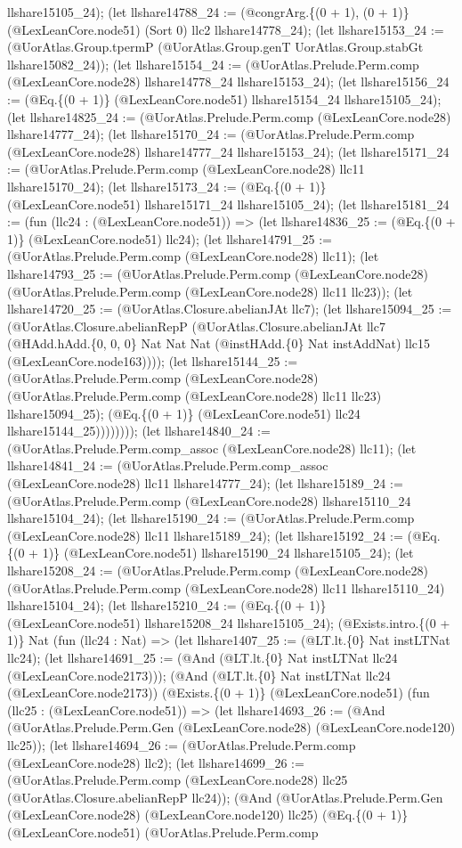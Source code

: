 \documentclass[11pt]{article}
\begin{document}
llshare15105\_24); (let llshare14788\_24 := (@congrArg.\{(0 + 1), (0 + 1)\} (@LexLeanCore.node51) (Sort 0) llc2 llshare14778\_24); (let llshare15153\_24 := (@UorAtlas.Group.tpermP (@UorAtlas.Group.genT UorAtlas.Group.stabGt llshare15082\_24)); (let llshare15154\_24 := (@UorAtlas.Prelude.Perm.comp (@LexLeanCore.node28) llshare14778\_24 llshare15153\_24); (let llshare15156\_24 := (@Eq.\{(0 + 1)\} (@LexLeanCore.node51) llshare15154\_24 llshare15105\_24); (let llshare14825\_24 := (@UorAtlas.Prelude.Perm.comp (@LexLeanCore.node28) llshare14777\_24); (let llshare15170\_24 := (@UorAtlas.Prelude.Perm.comp (@LexLeanCore.node28) llshare14777\_24 llshare15153\_24); (let llshare15171\_24 := (@UorAtlas.Prelude.Perm.comp (@LexLeanCore.node28) llc11 llshare15170\_24); (let llshare15173\_24 := (@Eq.\{(0 + 1)\} (@LexLeanCore.node51) llshare15171\_24 llshare15105\_24); (let llshare15181\_24 := (fun (llc24 : (@LexLeanCore.node51)) => (let llshare14836\_25 := (@Eq.\{(0 + 1)\} (@LexLeanCore.node51) llc24); (let llshare14791\_25 := (@UorAtlas.Prelude.Perm.comp (@LexLeanCore.node28) llc11); (let llshare14793\_25 := (@UorAtlas.Prelude.Perm.comp (@LexLeanCore.node28) (@UorAtlas.Prelude.Perm.comp (@LexLeanCore.node28) llc11 llc23)); (let llshare14720\_25 := (@UorAtlas.Closure.abelianJAt llc7); (let llshare15094\_25 := (@UorAtlas.Closure.abelianRepP (@UorAtlas.Closure.abelianJAt llc7 (@HAdd.hAdd.\{0, 0, 0\} Nat Nat Nat (@instHAdd.\{0\} Nat instAddNat) llc15 (@LexLeanCore.node163)))); (let llshare15144\_25 := (@UorAtlas.Prelude.Perm.comp (@LexLeanCore.node28) (@UorAtlas.Prelude.Perm.comp (@LexLeanCore.node28) llc11 llc23) llshare15094\_25); (@Eq.\{(0 + 1)\} (@LexLeanCore.node51) llc24 llshare15144\_25)))))))); (let llshare14840\_24 := (@UorAtlas.Prelude.Perm.comp\_assoc (@LexLeanCore.node28) llc11); (let llshare14841\_24 := (@UorAtlas.Prelude.Perm.comp\_assoc (@LexLeanCore.node28) llc11 llshare14777\_24); (let llshare15189\_24 := (@UorAtlas.Prelude.Perm.comp (@LexLeanCore.node28) llshare15110\_24 llshare15104\_24); (let llshare15190\_24 := (@UorAtlas.Prelude.Perm.comp (@LexLeanCore.node28) llc11 llshare15189\_24); (let llshare15192\_24 := (@Eq.\{(0 + 1)\} (@LexLeanCore.node51) llshare15190\_24 llshare15105\_24); (let llshare15208\_24 := (@UorAtlas.Prelude.Perm.comp (@LexLeanCore.node28) (@UorAtlas.Prelude.Perm.comp (@LexLeanCore.node28) llc11 llshare15110\_24) llshare15104\_24); (let llshare15210\_24 := (@Eq.\{(0 + 1)\} (@LexLeanCore.node51) llshare15208\_24 llshare15105\_24); (@Exists.intro.\{(0 + 1)\} Nat (fun (llc24 : Nat) => (let llshare1407\_25 := (@LT.lt.\{0\} Nat instLTNat llc24); (let llshare14691\_25 := (@And (@LT.lt.\{0\} Nat instLTNat llc24 (@LexLeanCore.node2173))); (@And (@LT.lt.\{0\} Nat instLTNat llc24 (@LexLeanCore.node2173)) (@Exists.\{(0 + 1)\} (@LexLeanCore.node51) (fun (llc25 : (@LexLeanCore.node51)) => (let llshare14693\_26 := (@And (@UorAtlas.Prelude.Perm.Gen (@LexLeanCore.node28) (@LexLeanCore.node120) llc25)); (let llshare14694\_26 := (@UorAtlas.Prelude.Perm.comp (@LexLeanCore.node28) llc2); (let llshare14699\_26 := (@UorAtlas.Prelude.Perm.comp (@LexLeanCore.node28) llc25 (@UorAtlas.Closure.abelianRepP llc24)); (@And (@UorAtlas.Prelude.Perm.Gen (@LexLeanCore.node28) (@LexLeanCore.node120) llc25) (@Eq.\{(0 + 1)\} (@LexLeanCore.node51) (@UorAtlas.Prelude.Perm.comp 
\end{document}
